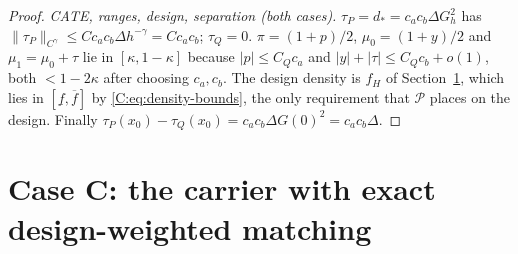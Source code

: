 \documentclass[11pt]{article}
\newcommand{\cP}{\mathcal{P}}
\newcommand{\norm}[1]{\lVert #1\rVert}
\newcommand{\abs}[1]{\lvert #1\rvert}
\begin{document}
\begin{proof}
\emph{CATE, ranges, design, separation (both cases).}
\(\tau_P=d_*=c_ac_b\Delta G_h^2\) has
\(\norm{\tau_P}_{C^\gamma}\le Cc_ac_b\Delta h^{-\gamma}=Cc_ac_b\);
\(\tau_Q=0\).  \(\pi=(1+p)/2\), \(\mu_0=(1+y)/2\) and \(\mu_1=\mu_0+\tau\) lie
in \([\kappa,1-\kappa]\) because \(\abs p\le C_Qc_a\) and
\(\abs y+\abs\tau\le C_Qc_b+o(1)\), both \(<1-2\kappa\) after choosing
\(c_a,c_b\).  The
design density is \(f_H\) of Section~\ref{C:sec:carrier}, which lies in
\([\underline f,\overline f]\) by \eqref{C:eq:density-bounds}, the only
requirement that \(\cP\) places on the design.  Finally
\(\tau_P(x_0)-\tau_Q(x_0)=c_ac_b\Delta G(0)^2=c_ac_b\Delta\).
\end{proof}

\section{Case C: the carrier with exact design-weighted matching}\label{C:sec:carrier}
\end{document}
